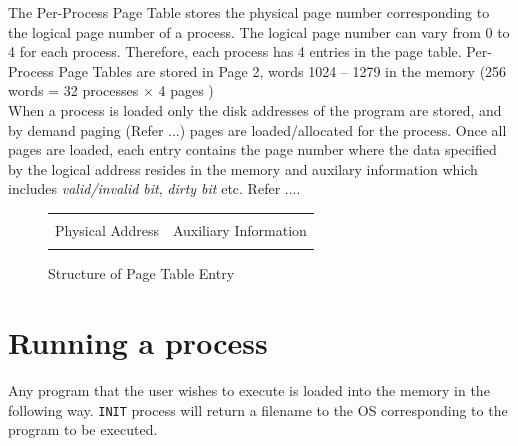 \documentclass[11pt]{report}
\begin{document}
The Per-Process Page Table stores the physical page number corresponding to the logical page number of a process. The logical page number can vary from 0 to 4 for each process.  Therefore, each process has 4 entries in the page table. Per-Process Page Tables are stored in Page 2, words 1024 -- 1279 in the memory (256 words = 32 processes $\times$ 4 pages )\\

When a process is loaded only the disk addresses of the program are stored, and by demand paging (Refer ...) pages are loaded/allocated for the process.	 Once all pages are loaded, each entry contains the page number where the data specified by the logical address resides in the memory and auxilary information which includes \textit{valid/invalid bit}, \textit{dirty bit} etc. Refer ....

		\begin{figure}[htp!]
		\centering
		\begin{tabular}{|c|c|}
		\hline
		  	 	& 			\\ 
		 	Physical Address & Auxiliary Information  \\
			 	& 			\\  \hline
		\end{tabular}
		\caption{Structure of Page Table Entry}
	\end{figure}

\section{Running a process}

Any program that the user wishes to execute is loaded into the memory in the following way. \texttt{INIT} process will return a filename to the OS corresponding to the program to be executed.
\end{document}
